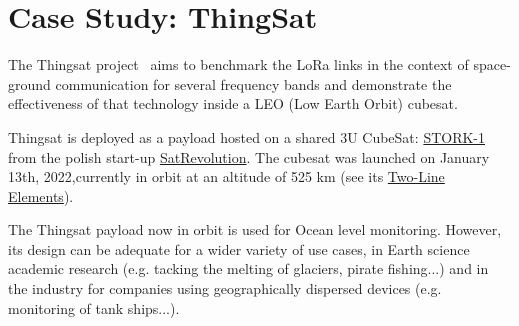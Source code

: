 \section{Case Study: ThingSat}
\label{sec:case-study}


The Thingsat project~\cite{git:thingsat-repo} aims to benchmark the LoRa links in the context of
space-ground communication for several frequency bands and demonstrate the
effectiveness of that technology inside a LEO (Low Earth Orbit) cubesat.

Thingsat is deployed as a payload hosted on a shared 3U CubeSat: \href{https://space.skyrocket.de/doc_sdat/stork-1.htm}{STORK-1} from the polish start-up \href{https://www.satrevolution.com/}{SatRevolution}. The cubesat was launched on January 13th, 2022,currently in orbit at an altitude of 525 km (see its 
\href{https://www.n2yo.com/database/?q=STORK-1\#results}{Two-Line Elements}).

The Thingsat payload now in orbit is used for Ocean level monitoring.
However, its design can be adequate for a wider variety of use cases, in Earth science academic research (e.g. tacking the  melting of glaciers, pirate fishing...) and in the industry for companies using geographically dispersed devices (e.g. monitoring of tank ships...). 

